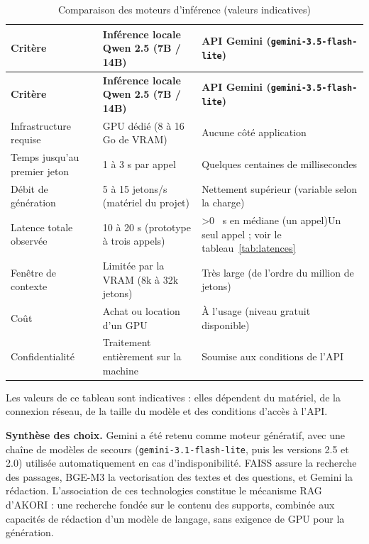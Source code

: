 \documentclass[12pt,a4paper,oneside]{report}
\newcommand{\siGemini}[2]{\ifnum\GemN>0 #1\else #2\fi}
\begin{document}
\begin{longtable}{p{}|p{}|p{}}
\caption{Comparaison des moteurs d'inférence (valeurs indicatives)}\label{tab:inference}\\
\hline
\textbf{Critère} & \textbf{Inférence locale Qwen 2.5 (7B / 14B)} & \textbf{API Gemini (\texttt{gemini-3.5-\allowbreak flash-lite})} \\ \hline
\endfirsthead
\hline
\textbf{Critère} & \textbf{Inférence locale Qwen 2.5 (7B / 14B)} & \textbf{API Gemini (\texttt{gemini-3.5-\allowbreak flash-lite})} \\ \hline
\endhead
Infrastructure requise & GPU dédié (8 à 16 Go de VRAM) & Aucune côté application \\ \hline
Temps jusqu'au premier jeton & 1 à 3 s par appel & Quelques centaines de millisecondes \\ \hline
Débit de génération & 5 à 15 jetons/s (matériel du projet) & Nettement supérieur (variable selon la charge) \\ \hline
Latence totale observée & 10 à 20 s (prototype à trois appels) & \siGemini{\GemTotal~s en médiane (un appel)}{Un seul appel ; voir le tableau~\ref{tab:latences}} \\ \hline
Fenêtre de contexte & Limitée par la VRAM (8k à 32k jetons) & Très large (de l'ordre du million de jetons) \\ \hline
Coût & Achat ou location d'un GPU & À l'usage (niveau gratuit disponible) \\ \hline
Confidentialité & Traitement entièrement sur la machine & Soumise aux conditions de l'API \\ \hline
\end{longtable}

Les valeurs de ce tableau sont indicatives : elles dépendent du matériel, de la connexion réseau, de la taille du modèle et des conditions d'accès à l'API.

\textbf{Synthèse des choix.} Gemini a été retenu comme moteur génératif, avec une chaîne de modèles de secours (\texttt{gemini-3.1-flash-lite}, puis les versions 2.5 et 2.0) utilisée automatiquement en cas d'indisponibilité. FAISS assure la recherche des passages, BGE-M3 la vectorisation des textes et des questions, et Gemini la rédaction. L'association de ces technologies constitue le mécanisme RAG d'AKORI : une recherche fondée sur le contenu des supports, combinée aux capacités de rédaction d'un modèle de langage, sans exigence de GPU pour la génération.
\end{document}
